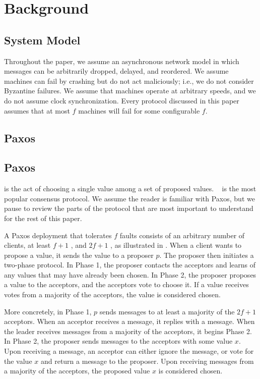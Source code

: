 \section{Background}

\subsection{System Model}
Throughout the paper, we assume an asynchronous network model in which messages
can be arbitrarily dropped, delayed, and reordered. We assume machines can fail
by crashing but do not act maliciously; i.e., we do not consider Byzantine
failures. We assume that machines operate at arbitrary speeds, and we do not
assume clock synchronization. Every protocol discussed in this paper assumes
that at most $f$ machines will fail for some configurable $f$.

\subsection{Paxos}

\subsection{Paxos}
 is the act of choosing a single value among a set of
proposed values. ~\cite{lamport1998part} is the most popular
consensus protocol. We assume the reader is familiar with Paxos, but we pause
to review the parts of the protocol that are most important to understand for
the rest of this paper.

A Paxos deployment that tolerates $f$ faults consists of an arbitrary number of
clients, at least $f+1$ , and $2f+1$ , as
illustrated in . When a client wants to propose
a value, it sends the value to a proposer $p$. The proposer then initiates a
two-phase protocol. In Phase 1, the proposer contacts the acceptors and learns
of any values that may have already been chosen. In Phase 2, the proposer
proposes a value to the acceptors, and the acceptors vote to choose it. If a
value receives votes from a majority of the acceptors, the value is considered
chosen.

More concretely, in Phase 1, $p$ sends  messages to at least a
majority of the $2f+1$ acceptors. When an acceptor receives a 
message, it replies with a  message. When the leader receives
 messages from a majority of the acceptors, it begins Phase 2.
%
In Phase 2, the proposer sends  messages to the acceptors with
some value $x$. Upon receiving a  message, an acceptor can
either ignore the message, or vote for the value $x$ and return a
 message to the proposer. Upon receiving 
messages from a majority of the acceptors, the proposed value $x$ is considered
chosen.

